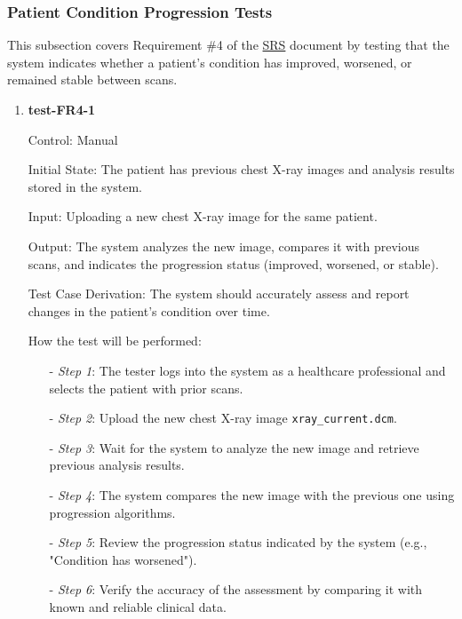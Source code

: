 \documentclass[12pt, titlepage]{article}
\begin{document}
\subsubsection{Patient Condition Progression Tests}

This subsection covers Requirement \#4 of the \href{https://github.com/RezaJodeiri/CXR-Capstone/blob/main/docs/SRS/SRS.pdf}{SRS} \citep{SRS}
document by testing that the system indicates whether a patient's condition has improved, worsened, or remained stable between scans.

\begin{enumerate}

\item \textbf{test-FR4-1} \label{test-FR4-1}

Control: Manual

Initial State: The patient has previous chest X-ray images and analysis results stored in the system.

Input: Uploading a new chest X-ray image for the same patient.

Output: The system analyzes the new image, compares it with previous scans, and indicates the progression status (improved, worsened, or stable).

Test Case Derivation: The system should accurately assess and report changes in the patient's condition over time.

How the test will be performed:

\begin{itemize}
  \item[-] \textit{Step 1}: The tester logs into the system as a healthcare professional and selects the patient with prior scans.
  \item[-] \textit{Step 2}: Upload the new chest X-ray image \texttt{xray\_current.dcm}.
  \item[-] \textit{Step 3}: Wait for the system to analyze the new image and retrieve previous analysis results.
  \item[-] \textit{Step 4}: The system compares the new image with the previous one using progression algorithms.
  \item[-] \textit{Step 5}: Review the progression status indicated by the system (e.g., "Condition has worsened").
  \item[-] \textit{Step 6}: Verify the accuracy of the assessment by comparing it with known and reliable clinical data.
\end{itemize}

\end{enumerate}
\end{document}
